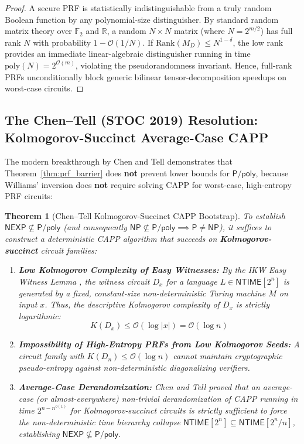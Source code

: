 \documentclass[11pt,a4paper]{article}
\newtheorem{theorem}{Theorem}[section]
\theoremstyle{definition}
\theoremstyle{remark}
\newcommand{\NP}{\mathsf{NP}}
\newcommand{\PP}{\mathsf{P}}
\newcommand{\Ppoly}{\mathsf{P/poly}}
\newcommand{\NEXP}{\mathsf{NEXP}}
\newcommand{\NTIME}{\mathsf{NTIME}}
\newcommand{\poly}{\mathrm{poly}}
\begin{document}
\begin{proof}
A secure PRF is statistically indistinguishable from a truly random Boolean function by any polynomial-size distinguisher. By standard random matrix theory over $\mathbb{F}_2$ and $\mathbb{R}$, a random $N \times N$ matrix (where $N = 2^{m/2}$) has full rank $N$ with probability $1 - \mathcal{O}(1/N)$. If $\mathrm{Rank}(M_D) \le N^{1-\delta}$, the low rank provides an immediate linear-algebraic distinguisher running in time $\poly(N) = 2^{\mathcal{O}(m)}$, violating the pseudorandomness invariant. Hence, full-rank PRFs unconditionally block generic bilinear tensor-decomposition speedups on worst-case circuits.
\end{proof}

\subsection{The Chen--Tell (STOC 2019) Resolution: Kolmogorov-Succinct Average-Case CAPP}

The modern breakthrough by Chen and Tell \cite{chen19} demonstrates that Theorem~\ref{thm:prf_barrier} does \textbf{not} prevent lower bounds for $\Ppoly$, because Williams' inversion does \textbf{not} require solving CAPP for worst-case, high-entropy PRF circuits:

\begin{theorem}[Chen--Tell Kolmogorov-Succinct CAPP Bootstrap]\label{thm:chen_tell}
To establish $\NEXP \not\subseteq \Ppoly$ (and consequently $\NP \not\subseteq \Ppoly \implies \PP \neq \NP$), it suffices to construct a deterministic CAPP algorithm that succeeds on \textbf{Kolmogorov-succinct} circuit families:
\begin{enumerate}
    \item \textbf{Low Kolmogorov Complexity of Easy Witnesses:} By the IKW Easy Witness Lemma \cite{ikw02}, the witness circuit $D_x$ for a language $L \in \NTIME[2^n]$ is generated by a fixed, constant-size non-deterministic Turing machine $M$ on input $x$. Thus, the descriptive Kolmogorov complexity of $D_x$ is strictly logarithmic:
    \[
    K(D_x) \le \mathcal{O}(\log |x|) = \mathcal{O}(\log n)
    \]
    \item \textbf{Impossibility of High-Entropy PRFs from Low Kolmogorov Seeds:} A circuit family with $K(D_n) \le \mathcal{O}(\log n)$ cannot maintain cryptographic pseudo-entropy against non-deterministic diagonalizing verifiers.
    \item \textbf{Average-Case Derandomization:} Chen and Tell \cite{chen19} proved that an average-case (or almost-everywhere) non-trivial derandomization of CAPP running in time $2^{n - n^{o(1)}}$ for Kolmogorov-succinct circuits is strictly sufficient to force the non-deterministic time hierarchy collapse $\NTIME[2^n] \subseteq \NTIME[2^n/n]$, establishing $\NEXP \not\subseteq \Ppoly$.
\end{enumerate}
\end{theorem}
\end{document}
